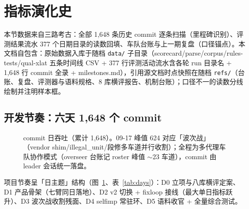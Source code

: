 \section{指标演化史}

本节数据来自三路考古：全部 1{,}648 条历史 commit 逐条扫描（里程碑识别）、评测结果流水 377 个日期目录的读数回填、车队台账与上一期复盘（口径锚点）。本文档自包含：原始数据入库于随档 \texttt{data/} 子目录（scorecard/parse/corpus/rules-tests/qual-xlat 五条时间线 CSV + 377 行评测活动流水含各轮 run 目录名 + 1{,}648 行 commit 全录 + milestones.md），引用源文档时点快照在随档 \texttt{refs/}（台账、复盘、评测器与语料规格、8 库横评报告、机制台账）；口径不一的读数分线绘制并注明样本框。

\subsection{开发节奏：六天 1{,}648 个 commit}

\begin{figure}[htbp]
\centering
{}
\caption{commit 日吞吐（累计 1{,}648）。09-17 峰值 624 对应「波次战」（vendor shim/illegal\_unit/段修多车道并行收割）；全程为多代理车队协作模式（overseer 台账记 roster 峰值 $\sim$23 车道），commit 由 leader 会话统一落盘。}
\label{fig:commits}
\end{figure}

项目节奏呈「日主题」结构（图~\ref{fig:commits}、表~\ref{tab:days}）：D0 立项与八库横评定案、D1 产品骨架（七臂同日落地）、D2 v2 切换 + fixloop 接线（最大单日指标跃升）、D3 波次战收割残面、D4 selfimp 常驻环、D5 语料收官 + 全量综合测试。

